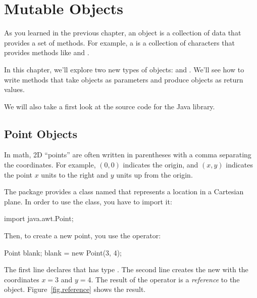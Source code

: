 \chapter{Mutable Objects}
\label{mutable}


As you learned in the previous chapter, an object is a collection of data that provides a set of methods.
For example, a  is a collection of characters that provides methods like  and .

In this chapter, we'll explore two new types of objects:  and .
We'll see how to write methods that take objects as parameters and produce objects as return values.

We will also take a first look at the source code for the Java library.


\section{Point Objects}
\label{point}


In math, 2D ``points'' are often written in parentheses with a comma separating the coordinates.
For example, $(0,0)$ indicates the origin, and $(x,y)$ indicates the point $x$ units to the right and $y$ units up from the origin.



The  package provides a class named  that represents a location in a Cartesian plane.
In order to use the  class, you have to import it:

\begin{code}
import java.awt.Point;
\end{code}


Then, to create a new point, you use the  operator:

\begin{code}
Point blank;
blank = new Point(3, 4);
\end{code}


The first line declares that  has type .
The second line creates the new  with the coordinates $x=3$ and $y=4$.
The result of the  operator is a {\em reference} to the object.
Figure~\ref{fig.reference} shows the result.

